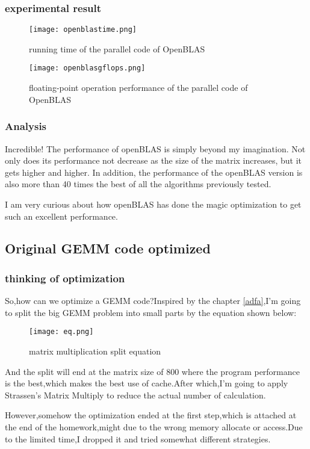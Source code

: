 \documentclass[11pt]{scrartcl} %
\begin{document}
	\subsubsection{experimental result}
		\begin{figure}[H]
			\centering
			\texttt{[image: openblastime.png]}
			\caption{running time of the parallel code of OpenBLAS}
			\label{}
		\end{figure}
		\begin{figure}[H]
			\centering
			\texttt{[image: openblasgflops.png]}
			\caption{floating-point operation performance of the parallel code of OpenBLAS}
			\label{}
		\end{figure}
		\subsubsection{Analysis}
		Incredible! The performance of openBLAS is simply beyond my imagination. Not only does its performance not decrease as the size of the matrix increases, but it gets higher and higher. In addition, the performance of the openBLAS version is also more than 40 times the best of all the algorithms previously tested.

I am very curious about how openBLAS has done the magic optimization to get such an excellent performance.
\subsection{Original GEMM code optimized}
	\subsubsection{thinking of optimization}
		So,how can we optimize a GEMM code?Inspired by the chapter \ref{adfa},I'm going to split the big GEMM problem into small parts by the equation shown below:
\begin{figure}[H]
	\centering
	\texttt{[image: eq.png]}
	\caption{matrix multiplication split equation}
	\label{}
\end{figure}
And the split will end at the matrix size of 800 where the program performance is the best,which makes the best use of cache.After which,I'm going to apply Strassen's Matrix Multiply to reduce the actual number of calculation.

However,somehow the optimization ended at the first step,which is attached at the end of the homework,might due to the wrong memory allocate or access.Due to the limited time,I dropped it and tried somewhat different strategies.
\end{document}
